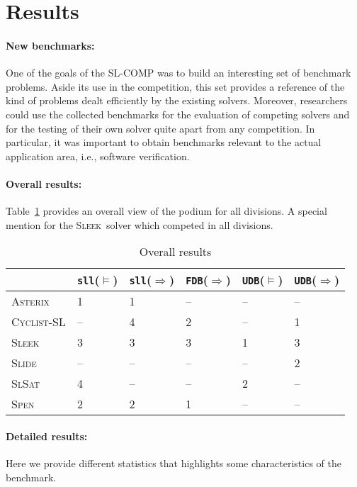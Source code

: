 \documentclass{llncs}
\newcommand{\limp}{\Rightarrow}
\newcommand{\sllsat}{\texttt{sll}($\models$)}
\newcommand{\sllent}{\texttt{sll}($\limp$)}
\newcommand{\FDBent}{\texttt{FDB}($\limp$)}
\newcommand{\UDBsat}{\texttt{UDB}($\models$)}
\newcommand{\UDBent}{\texttt{UDB}($\limp$)}
\newcommand{\ASTERIX}{\textsc{Asterix}}
\newcommand{\CYCLIST}{\textsc{Cyclist-SL}}
\newcommand{\SLEEK}{\textsc{Sleek}}
\newcommand{\SLIDE}{\textsc{Slide}}
\newcommand{\SLSAT}{\textsc{SlSat}}
\newcommand{\SPEN}{\textsc{Spen}}
\begin{document}
\section{Results}

\paragraph{New benchmarks:}
One of the goals of the SL-COMP was to build an interesting set of benchmark problems. 
Aside its use in the competition, this set provides a reference of the kind of problems dealt efficiently by the existing solvers.
Moreover, researchers could use the collected benchmarks for the evaluation of competing solvers and for the testing of their own solver quite apart from any competition. 
In particular, it was important to obtain benchmarks relevant to the actual application area, i.e., software verification.


\paragraph{Overall results:}
Table~\ref{tab:overall} provides an overall view of the podium for all divisions.
A special mention for the \SLEEK\ solver which competed in all divisions.


\begin{table}
\begin{center}
\begin{tabular}{p{2cm}p{2cm}p{2cm}p{2cm}p{2cm}p{1cm}}\hline
& \sllsat & \sllent & \FDBent
& \UDBsat & \UDBent \\\hline
\ASTERIX &
1 &
1 &
-- &
-- &
--
\\\hline
\CYCLIST &
-- &
4 &
2 &
-- &
1 
\\\hline
\SLEEK &
3 &
3 &
3 &
1 &
3
\\\hline
\SLIDE &
-- &
-- &
-- &
-- &
2
\\\hline
\SLSAT &
4  &
--  &
--  &
2  &
--
\\\hline
\SPEN &
2 &
2 &
1 &
-- &
--
\\\hline
\end{tabular}
\end{center}
\caption{Overall results}
\label{tab:overall}
\end{table}


\paragraph{Detailed results:}
Here we provide different statistics that highlights some characteristics of the benchmark. 
\end{document}

